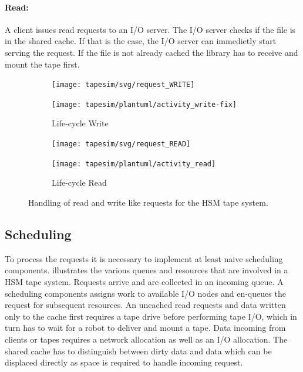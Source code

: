 \documentclass{../../template/esiwace-report}
\begin{document}
\paragraph{Read:}
A client issues read requests to an I/O server.
The I/O server checks if the file is in the shared cache.
If that is the case, the I/O server can immedietly start serving the request.
If the file is not already cached the library has to receive and mount the tape first.

\begin{figure} [h]
	\centering
	\begin{subfigure}[t]{0.47\textwidth}
		\centering
		\texttt{[image: tapesim/svg/request\_WRITE]}

		\vspace{0.6em}

		\texttt{[image: tapesim/plantuml/activity\_write-fix]}
		\caption{Life-cycle Write}
	\end{subfigure}
	\begin{subfigure}[t]{0.47\textwidth}
		\centering
		\texttt{[image: tapesim/svg/request\_READ]}

		\vspace{0.5em}

		\texttt{[image: tapesim/plantuml/activity\_read]}

		\caption{Life-cycle Read}
	\end{subfigure}

	\caption{Handling of read and write like requests for the HSM tape system.}
	\label{fig:request handling}
\end{figure}

\subsection{Scheduling}
\label{sec:refined/scheduling}

To process the requests it is necessary to implement at least naive scheduling components.
 illustrates the various queues and resources that are involved in a HSM tape system.
Requests arrive and are collected in an incoming queue.
A scheduling components assigns work to available I/O nodes and en-queues the request for subsequent resources.
An uncached read requests and data written only to the cache first requires a tape drive before performing tape I/O, which in turn has to wait for a robot to deliver and mount a tape.
Data incoming from clients or tapes requires a network allocation as well as an I/O allocation.
The shared cache has to distinguish between dirty data and data which can be displaced directly as space is required to handle incoming request.
\end{document}
